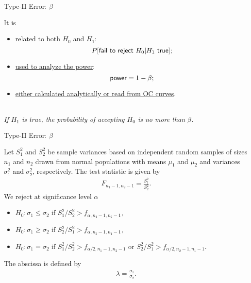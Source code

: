 \begin{frame}{Type-II Error: $\beta$}

\justifying
{} It is 
\begin{itemize}
	\item \underline{related to both $H_0$ and $H_1$}: $$P[\U{fail\ to\ reject\ } H_0|H_1\U{\ true}];$$
	\item \underline{used to analyze the power}: $$\mathsf{power} = 1 - \beta;$$
	\item \underline{either calculated analytically or read from OC curves}.
\end{itemize}
~\\
\highlightr{$\Delta$} \emph{If $H_1$ is true, the probability of accepting $H_0$ is no more than $\beta$.} \\

\end{frame}


\begin{frame}{Type-II Error: $\beta$}

\justifying
{} Let $S_1^2$ and $S_2^2$ be sample variances based on independent random samples of sizes $n_1$ and $n_2$ drawn from normal populations with means $\mu_1$ and $\mu_2$ and variances $\sigma_1^2$ and $\sigma_2^2$, respectively. The test statistic is given by
\begin{align*}
F_{n_1-1,n_2-1} = \frac{S_1^2}{S_2^2}.
\end{align*}
We reject at significance level $\alpha$
\begin{itemize}
	\justifying
	\item $H_0: \sigma_1 \leq \sigma_2$ if $S_1^2/S_2^2 > f_{\alpha, n_1-1, n_2-1}$,
	\item $H_0: \sigma_1 \geq \sigma_2$ if $S_2^2/S_1^2 > f_{\alpha, n_2-1, n_1-1}$,
	\item $H_0: \sigma_1 = \sigma_2$ if $S_1^2/S_2^2 > f_{\alpha/2, n_1-1, n_2-1}$ or $S_2^2/S_1^2 > f_{\alpha/2, n_2-1, n_1-1}$.
\end{itemize}
 The abscissa is defined by
\begin{align*}
\lambda = \frac{\sigma_1}{\sigma_2}.
\end{align*}

\end{frame}

